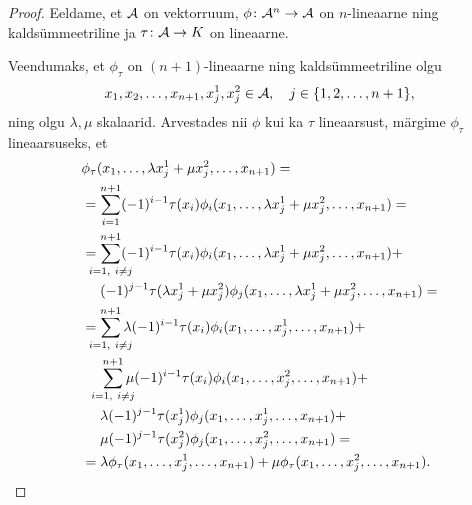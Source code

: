 \begin{proof}
    Eeldame, et $\mathcal{A}$ on vektorruum, $\phi \colon \mathcal{A}^n \to \mathcal{A}$ on
    $n$-lineaarne ning kaldsümmeetriline ja $\tau \colon \mathcal{A} \to K$
    on lineaarne.

    Veendumaks, et $\phi_\tau$ on $(n+1)$-lineaarne ning
    kaldsümmeetriline olgu
    \[
        x_1, x_2, \dots, x_{n+1}, x_j^1, x_j^2 \in \mathcal{A},
        \quad
        j \in \{1, 2, \dots, n+1\},
    \]
    ning olgu $\lambda, \mu$ skalaarid. Arvestades nii
    $\phi$ kui ka $\tau$ lineaarsust, märgime $\phi_\tau$
    lineaarsuseks, et
    \begin{align*}
        &\phi_\tau(
            x_1, \dots, \lambda x_j^1 + \mu x_j^2, \dots, x_{n+1}
        ) = \\
        &= \sum_{i=1}^{n+1} (-1)^{i-1} \tau(x_i) \phi_i(
             x_1, \dots, \lambda x_j^1 + \mu x_j^2, \dots, x_{n+1}
           ) = \\
        &= \sum_{\mathclap{i=1,\ i \ne j}}^{n+1} (-1)^{i-1}
           \tau(x_i) \phi_i(
             x_1, \dots, \lambda x_j^1 + \mu x_j^2, \dots, x_{n+1}
           ) + \\
        &\quad\ (-1)^{j-1} \tau(\lambda x_j^1 + \mu x_j^2)
           \phi_j(
             x_1, \dots, \lambda x_j^1 + \mu x_j^2, \dots, x_{n+1}
           ) = \\
        &= \sum_{\mathclap{i=1,\ i \ne j}}^{n+1}
           \lambda (-1)^{i-1} \tau(x_i) \phi_i(
             x_1, \dots, x_j^1, \dots, x_{n+1}
           ) + \\
        &\quad\ \sum_{\mathclap{i=1,\ i \ne j}}^{n+1} \mu
           (-1)^{i-1} \tau(x_i)
           \phi_i( x_1, \dots, x_j^2, \dots, x_{n+1} ) + \\
        &\quad\ \lambda (-1)^{j-1} \tau(x_j^1) \phi_j(
             x_1, \dots, x_j^1, \dots, x_{n+1}) + \\
        &\quad\ \mu (-1)^{j-1} \tau(x_j^2) \phi_j(
             x_1, \dots, x_j^2, \dots, x_{n+1}) = \\
        &= \lambda \phi_\tau(x_1, \dots, x_j^1, \dots, x_{n+1}) +
           \mu \phi_\tau(x_1, \dots, x_j^2, \dots, x_{n+1}).
    \end{align*}


\end{proof}
